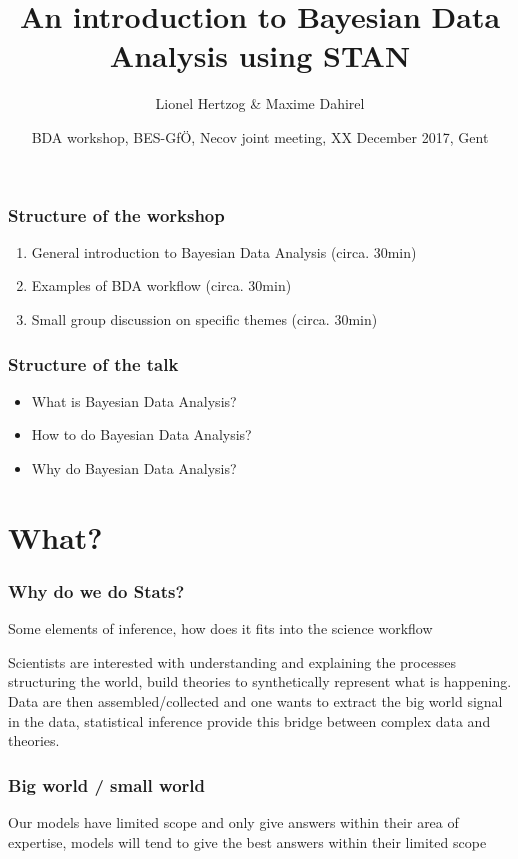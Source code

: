 \documentclass{beamer}
\title{An introduction to Bayesian Data Analysis using STAN}
\subtitle{}
\author{Lionel Hertzog \& Maxime Dahirel}
\date{BDA workshop, BES-Gf\"{O}, Necov joint meeting, XX December 2017, Gent}
\begin{document}
 
 \frame{\titlepage}
 

\begin{frame}
 \frametitle{\bf Structure of the workshop}
  \begin{enumerate}
   \item General introduction to Bayesian Data Analysis (circa. 30min)
   \item Examples of BDA workflow (circa. 30min)
   \item Small group discussion on specific themes (circa. 30min)
  \end{enumerate}

 
 \end{frame}
 
\begin{frame}
 \frametitle{\bf Structure of the talk}
  \begin{itemize}
   \item What is Bayesian Data Analysis?
   \item How to do Bayesian Data Analysis?
   \item Why do Bayesian Data Analysis?
  \end{itemize}

 
 \end{frame} 
 
 
\section*{What?} 
 
 \begin{frame}
  \frametitle{\bf Why do we do Stats?}
  
  Some elements of inference, how does it fits into the science workflow
  
  Scientists are interested with understanding and explaining the processes structuring the world, build theories to synthetically represent what is happening.
  Data are then assembled/collected and one wants to extract the big world signal in the data, statistical inference provide this bridge between complex data and
  theories. 
  
  
  
 \end{frame}

  \begin{frame}
  \frametitle{\bf Big world / small world}
  
  Our models have limited scope and only give answers within their area of expertise, models will tend to give the best answers within their limited scope  
  
 \end{frame}
 
\end{document}
